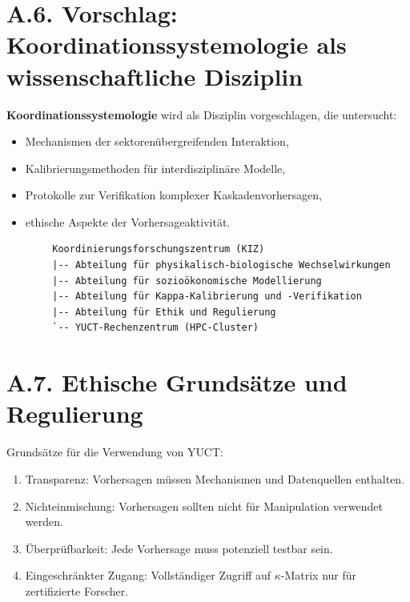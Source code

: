 \documentclass[13pt,a4paper]{article}
\begin{document}
	\section*{A.6. Vorschlag: Koordinationssystemologie als wissenschaftliche Disziplin}
	
	\textbf{Koordinationssystemologie} wird als Disziplin vorgeschlagen, die untersucht:
	\begin{itemize}[leftmargin=*]
		\item Mechanismen der sektorenübergreifenden Interaktion,
		\item Kalibrierungsmethoden für interdisziplinäre Modelle,
		\item Protokolle zur Verifikation komplexer Kaskadenvorhersagen,
		\item ethische Aspekte der Vorhersageaktivität.
	\end{itemize}
	
	\begin{lstlisting}
		Koordinierungsforschungszentrum (KIZ)
		|-- Abteilung für physikalisch-biologische Wechselwirkungen
		|-- Abteilung für sozioökonomische Modellierung
		|-- Abteilung für Kappa-Kalibrierung und -Verifikation
		|-- Abteilung für Ethik und Regulierung
		`-- YUCT-Rechenzentrum (HPC-Cluster)
	\end{lstlisting}
	
	\section*{A.7. Ethische Grundsätze und Regulierung}
	
	Grundsätze für die Verwendung von YUCT:
	\begin{enumerate}[leftmargin=*]
		\item Transparenz: Vorhersagen müssen Mechanismen und Datenquellen enthalten.
		\item Nichteinmischung: Vorhersagen sollten nicht für Manipulation verwendet werden.
		\item Überprüfbarkeit: Jede Vorhersage muss potenziell testbar sein.
		\item Eingeschränkter Zugang: Vollständiger Zugriff auf $\kappa$-Matrix nur für zertifizierte Forscher.
	\end{enumerate}
	
\end{document}

